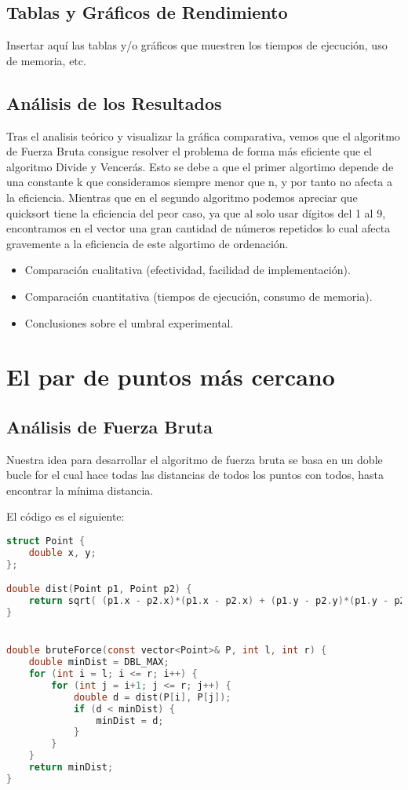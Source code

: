 \documentclass[a4paper,12pt]{article}
\begin{document}
\subsection{Tablas y Gráficos de Rendimiento}
Insertar aquí las tablas y/o gráficos que muestren los tiempos de ejecución,
uso de memoria, etc.

\subsection{Análisis de los Resultados}
Tras el analisis teórico y visualizar la gráfica comparativa, vemos que el algoritmo de Fuerza 
Bruta consigue resolver el problema de forma más eficiente que el algoritmo Divide y Vencerás. 
Esto se debe a que el primer algortimo depende de una constante k que consideramos siempre menor 
que n, y por tanto no afecta a la eficiencia. Mientras que en el segundo algoritmo podemos apreciar 
que quicksort tiene la eficiencia del peor caso, ya que al solo usar dígitos del 1 al 9, encontramos
en el vector una gran cantidad de números repetidos lo cual afecta gravemente a la eficiencia de este 
algortimo de ordenación.

\begin{itemize}
	\item Comparación cualitativa (efectividad, facilidad de implementación).
	\item Comparación cuantitativa (tiempos de ejecución, consumo de memoria).
	\item Conclusiones sobre el umbral experimental.
\end{itemize}



\section{El par de puntos más cercano}
\subsection{Análisis de Fuerza Bruta}
Nuestra idea para desarrollar el algoritmo de fuerza bruta se basa en un doble bucle for el cual hace todas las distancias de todos los puntos con todos, hasta encontrar la mínima distancia. 

El código es el siguiente:

\begin{lstlisting}[language=C, caption={Brute Force de \textbf{"El par de puntos más cercano"}}]
struct Point {
	double x, y;
};

double dist(Point p1, Point p2) {
	return sqrt( (p1.x - p2.x)*(p1.x - p2.x) + (p1.y - p2.y)*(p1.y - p2.y) );
}


double bruteForce(const vector<Point>& P, int l, int r) {
	double minDist = DBL_MAX;
	for (int i = l; i <= r; i++) {
		for (int j = i+1; j <= r; j++) {
			double d = dist(P[i], P[j]);
			if (d < minDist) {
				minDist = d;
			}
		}
	}
	return minDist;
}
\end{lstlisting}
\end{document}
